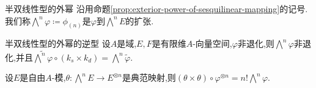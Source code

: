 \begin{definition}{半双线性型的外幂}{}
	沿用命题\ref{prop:exterior-power-of-sesquilinear-mapping}的记号.我们称$\bigwedge\limits^{n}\varphi\coloneq\phi_{\left(n\right)}$是$\varphi$到$\bigwedge^{n}E$的扩张.
\end{definition}

\begin{proposition}{半双线性型的外幂的逆型}{}
	设$A$是域,$E,F$是有限维$A$-向量空间,$\varphi$非退化,则$\bigwedge\limits^{n}\varphi$非退化,并且$\widetilde{\bigwedge\limits^{n}\varphi}\circ\left(k_{s}\times k_{d}\right)=\bigwedge\limits^{n}\tilde{\varphi}$.
\end{proposition}

\begin{remark}{}{}
	设$E$是自由$A$-模,$\theta:\bigwedge\limits^{n}E\to E^{\otimes n}$是典范映射,则$\left(\theta\times\theta\right)\circ\varphi^{\otimes n}=n!\bigwedge\limits^{n}\varphi$.
\end{remark}
